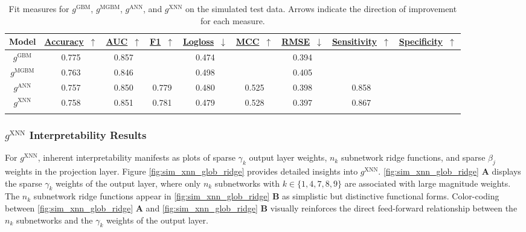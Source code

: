 \documentclass[information,article,submit,moreauthors,pdftex]{definitions/mdpi}
\begin{document}
\begin{table}[H]
	\caption{Fit measures for $g^\text{GBM}$, $g^\text{MGBM}$, $g^\text{ANN}$, and $g^\text{XNN}$ on the simulated test data. Arrows indicate the direction of improvement for each measure.}
	\centering
	\begin{tabular}{ccccccccc}
		\toprule
		\textbf{Model} & 
		\href{https://scikit-learn.org/stable/modules/model_evaluation.html#accuracy-score}{\textbf{Accuracy}}~$\uparrow$ & \href{https://en.wikipedia.org/wiki/Receiver_operating_characteristic#Area_under_the_curve}{\textbf{AUC}}~$\uparrow$ & \href{https://en.wikipedia.org/wiki/F1_score}{\textbf{F1}}~$\uparrow$ & 
		\href{https://scikit-learn.org/stable/modules/model_evaluation.html#log-loss}{\textbf{Logloss}}~$\downarrow$ & \href{https://en.wikipedia.org/wiki/Matthews_correlation_coefficient}{\textbf{MCC}}~$\uparrow$ & \href{https://en.wikipedia.org/wiki/Root-mean-square_deviation}{\textbf{RMSE}}~$\downarrow$ & \href{https://en.wikipedia.org/wiki/Sensitivity_and_specificity}{\textbf{Sensitivity}}~$\uparrow$ & \href{https://en.wikipedia.org/wiki/Sensitivity_and_specificity}{\textbf{Specificity}}~$\uparrow$ \\
		\midrule
		$g^\text{GBM}$		& 0.775	& 0.857	& & 0.474 &	& 0.394 & & \\
		$g^\text{MGBM}$		& 0.763	& 0.846	& & 0.498 &	& 0.405 & & \\
		$g^\text{ANN}$		& 0.757	& 0.850	& 0.779 & 0.480 &	0.525 & 0.398 & 0.858 & \\
		$g^\text{XNN}$		& 0.758	& 0.851	& 0.781 & 0.479 &	0.528 & 0.397 & 0.867 & \\
		\bottomrule
		\label{tab:sim_acc}
	\end{tabular}
\end{table}


\subsubsection{$g^\text{XNN}$ Interpretability Results}

For $g^\text{XNN}$, inherent interpretability manifests as plots of sparse $\gamma_k$ output layer weights, $n_k$ subnetwork ridge functions, and sparse $\beta_j$ weights in the projection layer. Figure \ref{fig:sim_xnn_glob_ridge} provides detailed insights into $g^\text{XNN}$. \ref{fig:sim_xnn_glob_ridge} \textbf{A} displays the sparse $\gamma_k$ weights of the output layer, where only $n_k$ subnetworks with $k \in \{1, 4, 7, 8, 9\}$ are associated with large magnitude weights. The $n_k$ subnetwork ridge functions appear in \ref{fig:sim_xnn_glob_ridge} \textbf{B} as simplistic but distinctive functional forms. Color-coding between \ref{fig:sim_xnn_glob_ridge} \textbf{A} and \ref{fig:sim_xnn_glob_ridge} \textbf{B} visually reinforces the direct feed-forward relationship between the $n_k$ subnetworks and the $\gamma_k$ weights of the output layer.
\end{document}
